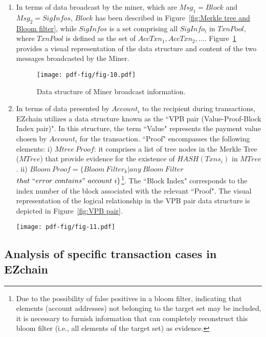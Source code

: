 \documentclass[conference]{IEEEtran}
\begin{document}
\begin{enumerate}
    \item In terms of data broadcast by the miner, which are $Msg_1=Block$ and $Msg_2=SigInfos$, $Block$ has been described in Figure~\ref{fig:Merkle tree and Bloom filter}, while $SigInfos$ is a set comprising all $SigInfo_i$ in $TxnPool$, where $TxnPool$ is defined as the set of ${AccTxn_1, AccTxn_2, …}$. Figure~\ref{fig:Miner broadcast data} provides a visual representation of the data structure and content of the two messages broadcasted by the Miner.
    \begin{figure}[htp!]
        \centering
        \texttt{[image: pdf-fig/fig-10.pdf]}
        \caption{Data structure of Miner broadcast information.}
        \label{fig:Miner broadcast data}
    \end{figure}
    \item In terms of data presented by $Account_i$ to the recipient during transactions, EZchain utilizes a data structure known as the ``VPB pair (Value-Proof-Block Index pair)". In this structure, the term ``Value" represents the payment value chosen by $Account_i$ for the transaction. ``Proof" encompasses the following elements: i) $Mtree~Proof$: it comprises a list of tree nodes in the Merkle Tree ($MTree$) that provide evidence for the existence of $HASH(Txns_i)$ in $MTree$. ii) $Bloom~Proof=\{Bloom~Filter_k|any~Bloom~Filter$ $that~``error~contains"~account~i\}$\footnote{Due to the possibility of false positives in a bloom filter, indicating that elements (account addresses) not belonging to the target set may be included, it is necessary to furnish information that can completely reconstruct this bloom filter (i.e., all elements of the target set) as evidence.}. The ``Block Index" corresponds to the index number of the block associated with the relevant ``Proof". The visual representation of the logical relationship in the VPB pair data structure is depicted in Figure~\ref{fig:VPB pair}.
    \begin{figure*}[htp!]
        \centering
        \texttt{[image: pdf-fig/fig-11.pdf]}
        \caption{VPB pair's data structure in EZchain.}
        \label{fig:VPB pair}
    \end{figure*}
\end{enumerate}

\subsection{Analysis of specific transaction cases in EZchain}
\label{subsec: EZchain case}
\end{document}
